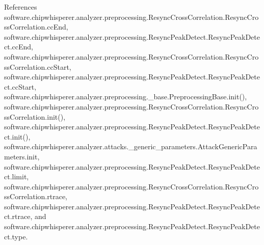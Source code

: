 References software.\+chipwhisperer.\+analyzer.\+preprocessing.\+Resync\+Cross\+Correlation.\+Resync\+Cross\+Correlation.\+cc\+End, software.\+chipwhisperer.\+analyzer.\+preprocessing.\+Resync\+Peak\+Detect.\+Resync\+Peak\+Detect.\+cc\+End, software.\+chipwhisperer.\+analyzer.\+preprocessing.\+Resync\+Cross\+Correlation.\+Resync\+Cross\+Correlation.\+cc\+Start, software.\+chipwhisperer.\+analyzer.\+preprocessing.\+Resync\+Peak\+Detect.\+Resync\+Peak\+Detect.\+cc\+Start, software.\+chipwhisperer.\+analyzer.\+preprocessing.\+\_\+base.\+Preprocessing\+Base.\+init(), software.\+chipwhisperer.\+analyzer.\+preprocessing.\+Resync\+Cross\+Correlation.\+Resync\+Cross\+Correlation.\+init(), software.\+chipwhisperer.\+analyzer.\+preprocessing.\+Resync\+Peak\+Detect.\+Resync\+Peak\+Detect.\+init(), software.\+chipwhisperer.\+analyzer.\+attacks.\+\_\+generic\+\_\+parameters.\+Attack\+Generic\+Parameters.\+init, software.\+chipwhisperer.\+analyzer.\+preprocessing.\+Resync\+Peak\+Detect.\+Resync\+Peak\+Detect.\+limit, software.\+chipwhisperer.\+analyzer.\+preprocessing.\+Resync\+Cross\+Correlation.\+Resync\+Cross\+Correlation.\+rtrace, software.\+chipwhisperer.\+analyzer.\+preprocessing.\+Resync\+Peak\+Detect.\+Resync\+Peak\+Detect.\+rtrace, and software.\+chipwhisperer.\+analyzer.\+preprocessing.\+Resync\+Peak\+Detect.\+Resync\+Peak\+Detect.\+type.



